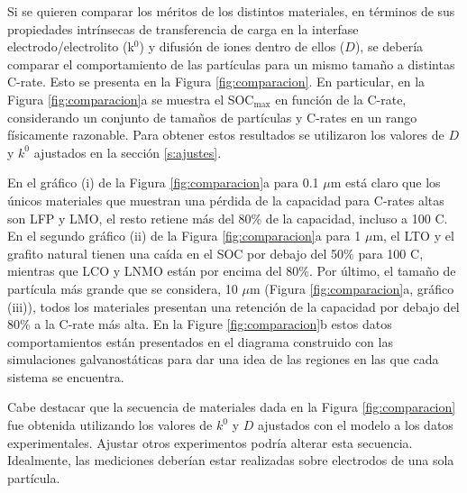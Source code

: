 Si se quieren comparar los méritos de los distintos materiales, en términos de 
sus propiedades intrínsecas de transferencia de carga en la interfase 
electrodo/electrolito (k$^0$) y difusión de iones dentro de ellos ($D$), se 
debería comparar el comportamiento de las partículas para un mismo tamaño a 
distintas C-rate. Esto se presenta en la Figura \ref{fig:comparacion}. En 
particular, en la Figura \ref{fig:comparacion}a se muestra el SOC$_{\max}$ 
en función de la C-rate, considerando un conjunto de tamaños de partículas y 
C-rates en un rango físicamente razonable. Para obtener estos resultados se 
utilizaron los valores de $D$ y $k^0$ ajustados en la sección \ref{s:ajustes}.

En el gráfico (i) de la Figura \ref{fig:comparacion}a para 0.1 $\mu$m está
claro que los únicos materiales que muestran una pérdida de la capacidad para
C-rates altas son LFP y LMO, el resto retiene más del 80\% de la capacidad, 
incluso a 100 C. En el segundo gráfico (ii) de la Figura
\ref{fig:comparacion}a para 1 $\mu$m, el LTO y el grafito natural tienen
una caída en el SOC por debajo del 50\% para 100 C, mientras que LCO y LNMO
están por encima del 80\%. Por último, el tamaño de partícula más grande que se 
considera, 10 $\mu$m (Figura \ref{fig:comparacion}a, gráfico (iii)), 
todos los materiales presentan una retención de la capacidad por debajo del 80\%
a la C-rate más alta. En la Figure \ref{fig:comparacion}b estos datos 
comportamientos están presentados en el diagrama construido con las simulaciones
galvanostáticas para dar una idea de las regiones en las que cada sistema se
encuentra. 

Cabe destacar que la secuencia de materiales dada en la Figura 
\ref{fig:comparacion} fue obtenida utilizando los valores de $k^0$ y $D$ 
ajustados con el modelo a los datos experimentales. Ajustar otros experimentos
podría alterar esta secuencia. Idealmente, las mediciones deberían estar 
realizadas sobre electrodos de una sola partícula.
